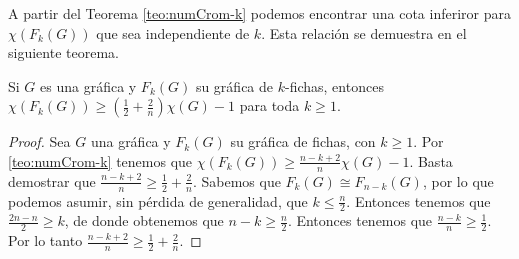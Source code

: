     A partir del Teorema \ref{teo:numCrom-k} podemos encontrar una cota
    inferiror para $\chi(F_k(G))$ que sea independiente de $k$. Esta relaci\'on
    se demuestra en el siguiente teorema.
    \begin{teorema}
    \label{teo:numCrom indep-k}
        Si $G$ es una gr\'afica y $F_k(G)$ su gr\'afica de $k$-fichas, entonces
        $\chi (F_k(G)) \geq (\frac{1}{2}+ \frac{2}{n})\chi(G) -1 $ para toda $k
        \geq 1$.
    \end{teorema}
    
    \begin{proof}
        Sea $G$ una gr\'afica y $F_k(G)$ su gr\'afica de fichas, con $k \geq 1$. Por
        \cref{teo:numCrom-k} tenemos que $\chi(F_k(G)) \geq
        \frac{n-k+2}{n} \chi(G) -1$. Basta demostrar que $\frac{n-k+2}{n} \geq
        \frac{1}{2}+\frac{2}{n}$. Sabemos que $F_k(G) \cong F_{n-k}(G)$, por lo que
        podemos asumir, sin p\'erdida de generalidad, que $k\leq \frac{n}{2}$.
        Entonces tenemos que $\frac{2n-n}{2}\geq k$, de donde obtenemos que $n-k
        \geq \frac{n}{2}$. Entonces tenemos que $\frac{n-k}{n}\geq \frac{1}{2}$. Por
        lo tanto $\frac{n-k+2}{n} \geq \frac{1}{2}+\frac{2}{n}$.
    \end{proof}